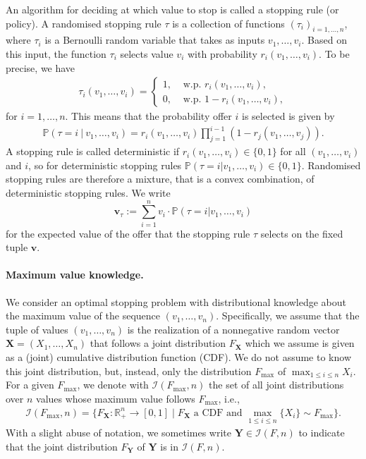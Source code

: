 \documentclass[11pt,a4paper]{article}
\numberwithin{equation}{section}
\newcommand{\Prob}{\mathbb{P}}
\begin{document}
An algorithm for deciding at which value to stop is called a stopping rule (or policy). A randomised stopping rule $\tau$ is a collection of functions $(\tau_i)_{i = 1,\dots,n}$, where $\tau_i$ is a Bernoulli random variable that takes as inputs $v_1,\dots,v_i$. Based on this input, the function $\tau_i$ selects value $v_i$ with probability $r_i(v_1,\dots,v_i)$. To be precise, we have
\begin{align*}
    \tau_i(v_1,\dots,v_i) =
    \begin{cases}
        1, & \text{ w.p. } r_i(v_1,\dots,v_i),\\
        0, & \text{ w.p. } 1 - r_i(v_1,\dots,v_i),
    \end{cases}
\end{align*}
for $i = 1,\dots,n$. This means that the probability offer $i$
is selected is given by
\begin{align*}
\Prob(\tau = i  \ | \   v_1,\dots,v_i) = r_i(v_1,\dots,v_i)\prod_{j=1}^{i-1}(1 - r_j(v_1,\dots,v_j)).
\end{align*}
A stopping rule is called deterministic if $r_i(v_1,\dots,v_i)\in\{0,1\}$ for all $(v_1,\dots,v_i)$ and $i$, so for deterministic stopping rules $\Prob(\tau = i  |  v_1,\dots,v_i)\in\{0,1\}$. Randomised stopping rules are therefore a mixture, that is a convex combination, of deterministic stopping rules.
We write
$$
\boldsymbol{v}_{\tau} :=  \sum_{i=1}^n v_i\cdot\Prob(\tau = i |  v_1,\dots,v_i)
$$
for the expected value of the offer that the stopping rule $\tau$ selects on the fixed tuple $\boldsymbol{v}$. \bigskip



\noindent \paragraph{Maximum value knowledge.} We consider an optimal stopping problem with distributional knowledge about the maximum value of the sequence $(v_1,\dots,v_n)$.
Specifically, we assume that the tuple of values $(v_1,\dots,v_n)$ is the realization of a nonnegative random vector $\mathbf{X} = (X_1,\dots,X_n)$ that follows a joint distribution $F_\mathbf{X}$ which we assume is given as a (joint) cumulative distribution function (CDF). We do not assume to know this joint distribution, but, instead, only the distribution $F_{\max}$ of $\max_{1 \leq i \leq n} X_i$. For a given $F_{\max}$, we denote with $\mathcal{I}(F_{\max},n)$ the set of all joint distributions over $n$ values whose maximum value follows $F_{\max}$, i.e.,
\begin{align}
    \mathcal{I}(F_{\max},n)=\{F_{\boldsymbol{X}}:\mathbb{R}^n_+\to[0,1]\;|\;F_{\boldsymbol{X}}\text{ a CDF and }
\max_{1\le i\le n}\{X_i\}\sim F_{\max}\}.\label{eq:instance-ambiguity-set}
\end{align} 
With a slight abuse of notation, we sometimes write $\boldsymbol{Y}\in\mathcal{I}(F,n)$ to indicate that the joint distribution $F_{\mathbf{Y}}$ of $\mathbf{Y}$ is in $\mathcal{I}(F,n)$.
\end{document}

